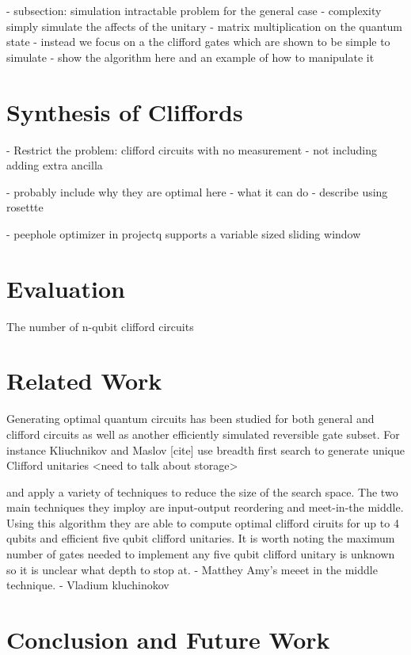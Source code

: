 \documentclass{article}
\begin{document}
  - subsection: simulation
  intractable problem for the general case - complexity
  simply simulate the affects of the unitary - matrix multiplication on the quantum state
  - instead we focus on a the clifford gates which are shown to be simple to simulate
  - show the algorithm here and an example of how to manipulate it


\section{Synthesis of Cliffords}
- Restrict the problem: clifford circuits with no measurement
  - not including adding extra ancilla

- probably include why they are optimal here
- what it can do
- describe using rosettte

- peephole optimizer in projectq supports a variable sized sliding window

\section{Evaluation}
The number of n-qubit clifford circuits 

\section{Related Work}
Generating optimal quantum circuits has been studied for both general and clifford circuits as well as another efficiently simulated reversible gate subset. For instance Kliuchnikov and Maslov [cite] use breadth first search to generate unique Clifford unitaries <need to talk about storage>

and apply a variety of techniques to reduce the size of the search space. The two main techniques they imploy are input-output reordering and meet-in-the middle. 
Using this algorithm they are able to compute optimal clifford ciruits for up to 4 qubits and efficient five qubit clifford unitaries. It is worth noting the maximum number of gates needed to implement any five qubit clifford unitary is unknown so it is unclear what depth to stop at.
- Matthey Amy's 
   meeet in the middle technique.
- Vladium kluchinokov

\section{Conclusion and Future Work}




\end{document}
